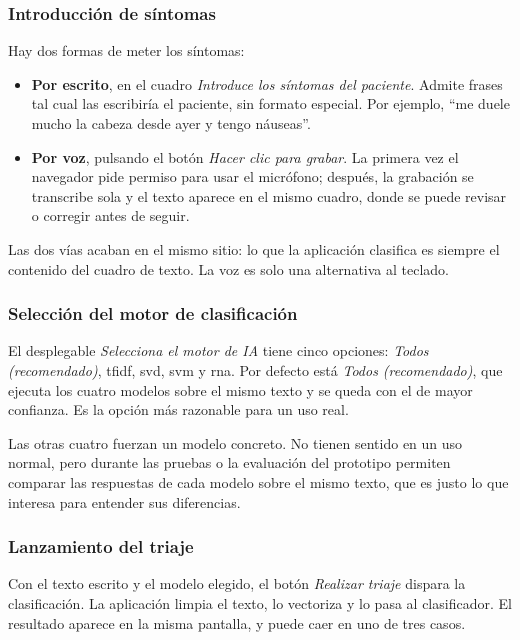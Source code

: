 \subsubsection*{Introducción de síntomas}

Hay dos formas de meter los síntomas:

\begin{itemize}
	\item \textbf{Por escrito}, en el cuadro \textit{Introduce los síntomas del paciente}. Admite frases tal cual las escribiría el paciente, sin formato especial. Por ejemplo, ``me duele mucho la cabeza desde ayer y tengo náuseas''.
	\item \textbf{Por voz}, pulsando el botón \textit{Hacer clic para grabar}. La primera vez el navegador pide permiso para usar el micrófono; después, la grabación se transcribe sola y el texto aparece en el mismo cuadro, donde se puede revisar o corregir antes de seguir.
\end{itemize}

Las dos vías acaban en el mismo sitio: lo que la aplicación clasifica es siempre el contenido del cuadro de texto. La voz es solo una alternativa al teclado.

\subsubsection*{Selección del motor de clasificación}

El desplegable \textit{Selecciona el motor de IA} tiene cinco opciones: \textit{Todos (recomendado)}, \acrshort{tfidf}, \acrshort{svd}, \acrshort{svm} y \acrshort{rna}. Por defecto está \textit{Todos (recomendado)}, que ejecuta los cuatro modelos sobre el mismo texto y se queda con el de mayor confianza. Es la opción más razonable para un uso real.

Las otras cuatro fuerzan un modelo concreto. No tienen sentido en un uso normal, pero durante las pruebas o la evaluación del prototipo permiten comparar las respuestas de cada modelo sobre el mismo texto, que es justo lo que interesa para entender sus diferencias.

\subsubsection*{Lanzamiento del triaje}

Con el texto escrito y el modelo elegido, el botón \textit{Realizar triaje} dispara la clasificación. La aplicación limpia el texto, lo vectoriza y lo pasa al clasificador. El resultado aparece en la misma pantalla, y puede caer en uno de tres casos.

